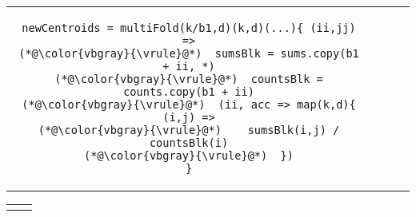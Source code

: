\begin{tabular}{cm{}m{}m{}}
{\begin{lstlisting}
newCentroids = multiFold(k/b1,d)(k,d)(...){ (ii,jj) =>
(*@\color{vbgray}{\vrule}@*)  sumsBlk = sums.copy(b1 + ii, *)
(*@\color{vbgray}{\vrule}@*)  countsBlk = counts.copy(b1 + ii)
(*@\color{vbgray}{\vrule}@*)  (ii, acc => map(k,d){ (i,j) =>
(*@\color{vbgray}{\vrule}@*)    sumsBlk(i,j) / countsBlk(i)
(*@\color{vbgray}{\vrule}@*)  })
}
\end{lstlisting}}
\end{tabular}

\vspace{-0.2in}\begin{tabular}{cc}
{\parbox{0.45\textwidth}{}} &
{\parbox{0.5\textwidth}{}}
\end{tabular}

\hspace{-0.180\textwidth}
